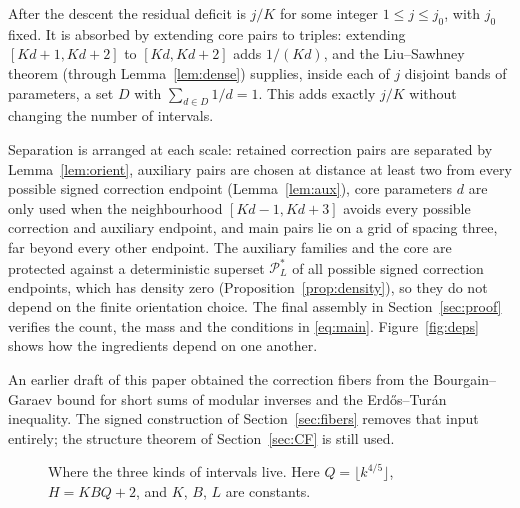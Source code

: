 \documentclass[11pt,letterpaper]{article}
\numberwithin{equation}{section}
\theoremstyle{plain}
\theoremstyle{remark}
\newcommand{\cP}{\mathcal P}
\begin{document}
After the descent the residual deficit is $j/K$ for some integer $1\le j\le j_0$, with $j_0$ fixed. It is absorbed by extending core pairs to triples: extending $[Kd+1,Kd+2]$ to $[Kd,Kd+2]$ adds $1/(Kd)$, and the Liu--Sawhney theorem (through Lemma~\ref{lem:dense}) supplies, inside each of $j$ disjoint bands of parameters, a set $D$ with $\sum_{d\in D}1/d=1$. This adds exactly $j/K$ without changing the number of intervals.

Separation is arranged at each scale: retained correction pairs are separated by Lemma~\ref{lem:orient}, auxiliary pairs are chosen at distance at least two from every possible signed correction endpoint (Lemma~\ref{lem:aux}), core parameters $d$ are only used when the neighbourhood $[Kd-1,Kd+3]$ avoids every possible correction and auxiliary endpoint, and main pairs lie on a grid of spacing three, far beyond every other endpoint. The auxiliary families and the core are protected against a deterministic superset $\cP^*_L$ of all possible signed correction endpoints, which has density zero (Proposition~\ref{prop:density}), so they do not depend on the finite orientation choice. The final assembly in Section~\ref{sec:proof} verifies the count, the mass and the conditions in \eqref{eq:main}. Figure~\ref{fig:deps} shows how the ingredients depend on one another.

An earlier draft of this paper obtained the correction fibers from the Bourgain--Garaev bound for short sums of modular inverses \cite{BG} and the Erd\H{o}s--Tur\'an inequality. The signed construction of Section~\ref{sec:fibers} removes that input entirely; the structure theorem of Section~\ref{sec:CF} is still used.

\begin{figure}[ht]
\centering
{}
\caption{Where the three kinds of intervals live. Here $Q=\lfloor k^{4/5}\rfloor$, $H=KBQ+2$, and $K$, $B$, $L$ are constants.}\label{fig:line}
\end{figure}
\end{document}

